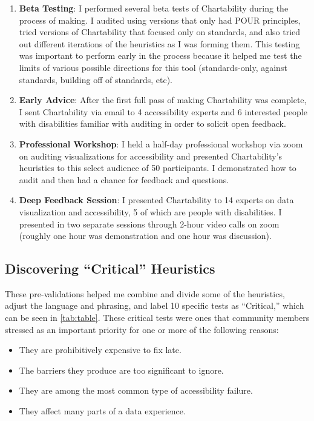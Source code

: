 \documentclass{egpubl}
\begin{document}
\begin{enumerate}
    \item \textbf{Beta Testing}: I performed several beta tests of Chartability during the process of making. I audited using versions that only had POUR principles, tried versions of Chartability that focused only on standards, and also tried out different iterations of the heuristics as I was forming them. This testing was important to perform early in the process because it helped me test the limits of various possible directions for this tool (standards-only, against standards, building off of standards, etc).
    \item \textbf{Early Advice}: After the first full pass of making Chartability was complete, I sent Chartability via email to 4 accessibility experts and 6 interested people with disabilities familiar with auditing in order to solicit open feedback. 
    \item \textbf{Professional Workshop}: I held a half-day professional workshop via zoom on auditing visualizations for accessibility and presented Chartability’s heuristics to this select audience of 50 participants. I demonstrated how to audit and then had a chance for feedback and questions.
    \item \textbf{Deep Feedback Session}: I presented Chartability to 14 experts on data visualization and accessibility, 5 of which are people with disabilities. I presented in two separate sessions through 2-hour video calls on zoom (roughly one hour was demonstration and one hour was discussion). 
\end{enumerate}

\subsection{Discovering ``Critical'' Heuristics}
\label{sec:critical heuristics}
These pre-validations helped me combine and divide some of the heuristics, adjust the language and phrasing, and label 10 specific tests as ``Critical,'' which can be seen in \autoref{tab:table}. These critical tests were ones that community members stressed as an important priority for one or more of the following reasons:
\begin{itemize}
    \item They are prohibitively expensive to fix late.
    \item The barriers they produce are too significant to ignore.
    \item They are among the most common type of accessibility failure.
    \item They affect many parts of a data experience.
\end{itemize}
\end{document}
